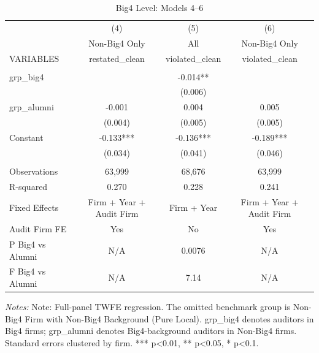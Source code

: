 \begin{table}[htbp]
\footnotesize
\centering
\caption{Big4 Level: Models 4--6}
\begin{threeparttable}
\begin{tabular}{p{}ccc}
\toprule
 & (4) & (5) & (6) \\
 & Non-Big4 Only & All & Non-Big4 Only \\
VARIABLES & restated\_clean & violated\_clean & violated\_clean \\
\midrule
 &  &  &  \\
grp\_big4 &  & -0.014** &  \\
 &  & (0.006) &  \\
grp\_alumni & -0.001 & 0.004 & 0.005 \\
 & (0.004) & (0.005) & (0.005) \\
Constant & -0.133*** & -0.136*** & -0.189*** \\
 & (0.034) & (0.041) & (0.046) \\
 &  &  &  \\
Observations & 63,999 & 68,676 & 63,999 \\
R-squared & 0.270 & 0.228 & 0.241 \\
Fixed Effects & Firm + Year + Audit Firm & Firm + Year & Firm + Year + Audit Firm \\
Audit Firm FE & Yes & No & Yes \\
P Big4 vs Alumni & N/A & 0.0076 & N/A \\
F Big4 vs Alumni & N/A & 7.14 & N/A \\
\bottomrule
\end{tabular}
\begin{tablenotes}\footnotesize
\item \raggedright \textit{Notes:} Note: Full-panel TWFE regression. The omitted benchmark group is Non-Big4 Firm with Non-Big4 Background (Pure Local). grp\_big4 denotes auditors in Big4 firms; grp\_alumni denotes Big4-background auditors in Non-Big4 firms. Standard errors clustered by firm. *** p<0.01, ** p<0.05, * p<0.1.
\end{tablenotes}
\end{threeparttable}
\end{table}

